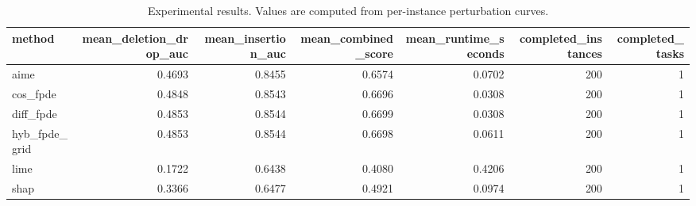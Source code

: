 \begin{table}[t]
\caption{Experimental results. Values are computed from per-instance perturbation curves.}
\label{tab:main_results_computed}
\centering
\begin{tabular}{lrrrrrr}
\toprule
method & mean\_deletion\_drop\_auc & mean\_insertion\_auc & mean\_combined\_score & mean\_runtime\_seconds & completed\_instances & completed\_tasks \\
\midrule
aime & 0.4693 & 0.8455 & 0.6574 & 0.0702 & 200 & 1 \\
cos\_fpde & 0.4848 & 0.8543 & 0.6696 & 0.0308 & 200 & 1 \\
diff\_fpde & 0.4853 & 0.8544 & 0.6699 & 0.0308 & 200 & 1 \\
hyb\_fpde\_grid & 0.4853 & 0.8544 & 0.6698 & 0.0611 & 200 & 1 \\
lime & 0.1722 & 0.6438 & 0.4080 & 0.4206 & 200 & 1 \\
shap & 0.3366 & 0.6477 & 0.4921 & 0.0974 & 200 & 1 \\
\bottomrule
\end{tabular}

\end{table}
